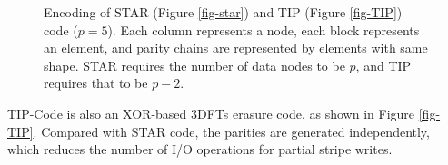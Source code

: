 \documentclass[sigconf]{acmart}
\begin{document}
\begin{figure}[!ht]
\centering
{}
\hspace{5pt}
\vspace{-3mm}
\caption{\small{Encoding of STAR (Figure \ref{fig-star}) and TIP (Figure \ref{fig-TIP}) code ($p = 5$). Each column represents a node, each block represents an element, and parity chains are represented by elements with same shape. STAR requires the number of data nodes to be $p$, and TIP requires that to be $p-2$.}}
\vspace{-3mm}
\label{fig-star-TIP}
\end{figure}

TIP-Code is also an XOR-based 3DFTs erasure code, as shown in Figure \ref{fig-TIP}.
Compared with STAR code, the parities are generated independently, which reduces the number of I/O operations for partial stripe writes.
\end{document}
